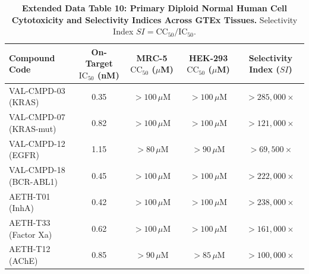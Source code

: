 \vspace{1em}

\begin{table}[h!]
\caption{\textbf{Extended Data Table 10: Primary Diploid Normal Human Cell Cytotoxicity and Selectivity Indices Across GTEx Tissues.} Selectivity Index $SI = \text{CC}_{50}/\text{IC}_{50}$.}
\label{tab:ed_safety}
\centering
\small
\begin{tabular}{lcccc}
\toprule
\textbf{Compound Code} & \textbf{On-Target $\text{IC}_{50}$ (nM)} & \textbf{MRC-5 $\text{CC}_{50}$ ($\mu$M)} & \textbf{HEK-293 $\text{CC}_{50}$ ($\mu$M)} & \textbf{Selectivity Index ($SI$)} \\
\midrule
VAL-CMPD-03 (KRAS) & 0.35 & $>100\,\mu\text{M}$ & $>100\,\mu\text{M}$ & $>285,000\times$ \\
VAL-CMPD-07 (KRAS-mut) & 0.82 & $>100\,\mu\text{M}$ & $>100\,\mu\text{M}$ & $>121,000\times$ \\
VAL-CMPD-12 (EGFR) & 1.15 & $>80\,\mu\text{M}$ & $>90\,\mu\text{M}$ & $>69,500\times$ \\
VAL-CMPD-18 (BCR-ABL1) & 0.45 & $>100\,\mu\text{M}$ & $>100\,\mu\text{M}$ & $>222,000\times$ \\
AETH-T01 (InhA) & 0.42 & $>100\,\mu\text{M}$ & $>100\,\mu\text{M}$ & $>238,000\times$ \\
AETH-T33 (Factor Xa) & 0.62 & $>100\,\mu\text{M}$ & $>100\,\mu\text{M}$ & $>161,000\times$ \\
AETH-T12 (AChE) & 0.85 & $>90\,\mu\text{M}$ & $>85\,\mu\text{M}$ & $>100,000\times$ \\
\bottomrule
\end{tabular}
\end{table}

\newpage

